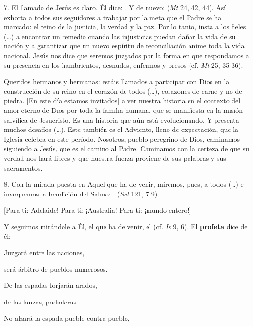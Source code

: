 \begin{body}
					7. El llamado de Jesús es claro. Él dice: . Y de nuevo:  (\emph{Mt} 24, 42, 44). Así exhorta a todos sus seguidores a trabajar por la meta que el Padre se ha marcado: el reino de la justicia, la verdad y la paz. Por lo tanto, insta a los fieles (\ldots{}) a encontrar un remedio cuando las injusticias puedan dañar la vida de su nación y a garantizar que un nuevo espíritu de reconciliación anime toda la vida nacional. Jesús nos dice que seremos juzgados por la forma en que respondamos a su presencia en los hambrientos, desnudos, enfermos y presos (cf. \emph{Mt} 25, 35-36).
					
					Queridos hermanos y hermanas: estáis llamados a participar con Dios en la construcción de su reino en el corazón de todos (\ldots{}), corazones de carne y no de piedra. {[}En este día estamos invitados{]} a ver nuestra historia en el contexto del amor eterno de Dios por toda la familia humana, que se manifiesta en la misión salvífica de Jesucristo. Es una historia que aún está evolucionando. Y presenta muchos desafíos (\ldots{}). Este también es el Adviento, lleno de expectación, que la Iglesia celebra en este período. Nosotros, pueblo peregrino de Dios, caminamos siguiendo a Jesús, que es el camino al Padre. Caminamos con la certeza de que su verdad nos hará libres y que nuestra fuerza proviene de sus palabras y sus sacramentos.
					
					8. Con la mirada puesta en Aquel que ha de venir, miremos, pues, a todos (\ldots{}) e invoquemos la bendición del Salmo: . (\emph{Sal} 121, 7-9).
					
					{[}Para ti: Adelaide! Para ti: ¡Australia! Para ti: ¡mundo entero!{]} 
					
					Y seguimos mirándole a Él, el que ha de venir, el  (cf. \emph{Is} 9, 6). El \textbf{profeta} dice de él: 
					
					Juzgará entre las naciones, 
					
					será árbitro de pueblos numerosos. 
					
					De las espadas forjarán arados, 
					
					de las lanzas, podaderas. 
					
					No alzará la espada pueblo contra pueblo, 
					

\end{body}
